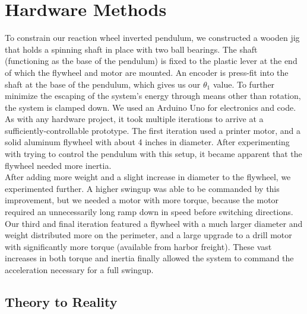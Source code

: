 \documentclass[conference]{IEEEtran}
\begin{document}
\section{Hardware Methods}
To constrain our reaction wheel inverted pendulum, we constructed a wooden jig that holds a spinning shaft in place with two ball bearings. The shaft (functioning as the base of the pendulum) is fixed to the plastic lever at the end of which the flywheel and motor are mounted. An encoder is press-fit into the shaft at the base of the pendulum, which gives us our $\theta_1$ value. To further minimize the escaping of the system's energy through means other than rotation, the system is clamped down. We used an Arduino Uno for electronics and code.\\ \indent
As with any hardware project, it took multiple iterations to arrive at a sufficiently-controllable prototype. The first iteration used a printer motor, and a solid aluminum flywheel with about 4 inches in diameter.  After experimenting with trying to control the pendulum with this setup, it became apparent that the flywheel needed more inertia. \\ \indent
After adding more weight and a slight increase in diameter to the flywheel, we experimented further. A higher swingup was able to be commanded by this improvement, but we needed a motor with more torque, because the motor required an unnecessarily long ramp down in speed before switching directions.\\ \indent 
Our third and final iteration featured a flywheel with a much larger diameter and weight distributed more on the perimeter, and a large upgrade to a drill motor with significantly more torque (available from harbor freight). These vast increases in both torque and inertia finally allowed the system to command the acceleration necessary for a full swingup.

\subsection{Theory to Reality}
\end{document}
